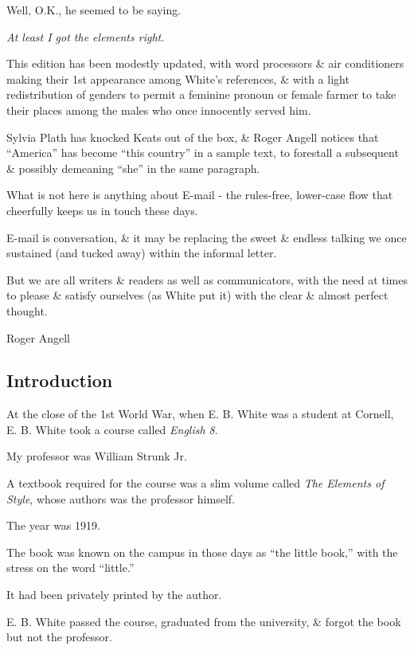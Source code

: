 \documentclass{article}
\begin{document}
Well, O.K., he seemed to be saying.

{\it At least I got the elements right}.

%
This edition has been modestly updated, with word processors \& air conditioners making their 1st appearance among White's references, \& with a light redistribution of genders to permit a feminine pronoun or female farmer to take their places among the males who once innocently served him.

Sylvia Plath has knocked Keats out of the box, \& Roger Angell notices that ``America'' has become ``this country'' in a sample text, to forestall a subsequent \& possibly demeaning ``she'' in the same paragraph.

What is not here is anything about E-mail - the rules-free, lower-case flow that cheerfully keeps us in touch these days.

E-mail is conversation, \& it may be replacing the sweet \& endless talking we once sustained (and tucked away) within the informal letter.

But we are all writers \& readers as well as communicators, with the need at times to please \& satisfy ourselves (as White put it) with the clear \& almost perfect thought.

\begin{flushright}
	Roger Angell
\end{flushright}


\subsection*{Introduction}

At the close of the 1st World War, when E. B. White was a student at Cornell, E. B. White took a course called {\it English 8}.

My professor was William Strunk Jr.

A textbook required for the course was a slim volume called {\it The Elements of Style}, whose authors was the professor himself.

The year was 1919.

The book was known on the campus in those days as ``the little book,'' with the stress on the word ``little.''

It had been privately printed by the author.

%
E. B. White passed the course, graduated from the university, \& forgot the book but not the professor.
\end{document}

